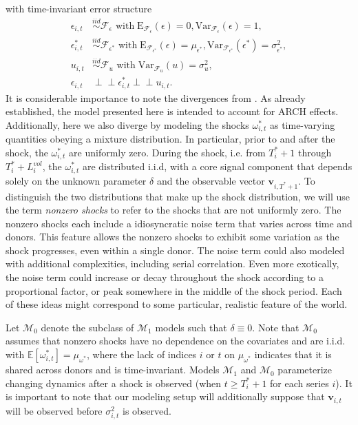 \documentclass[11pt,3p,review,authoryear]{elsarticle}
\newcommand{\x}{\textbf{v}}
\newcommand{\simiid}{\stackrel{iid}{\sim}} %
\newcommand{\indep}{\perp \!\!\! \perp } %
\def\mrm#1{\mathrm{#1}} %
\def\mc#1{\mathcal{#1}} %
\def\E{\mathbb{E}} %
\def\mc#1{\mathcal{#1}}
\theoremstyle{definition}
\begin{document}
with time-invariant error structure
  \begin{align*}
    \epsilon_{i,t} &\simiid \mc{F}_{\epsilon} \text{ with}  \; \mrm{E}_{\mc{F}_{\epsilon}}(\epsilon) = 0, \mrm{Var}_{\mc{F}_{\epsilon}}(\epsilon)  = 1,  \\
    \epsilon^{*}_{i,t} &\simiid \mc{F}_{\epsilon^{*}} \text{ with}  \; \mrm{E}_{\mc{F}_{\epsilon^{*}}}(\epsilon) = \mu_{\epsilon^{*}}, \mrm{Var}_{\mc{F}_{\epsilon^{*}}}(\epsilon^{*})  = \sigma^2_{\epsilon^{*}},  \\
    u_{i,t} & \simiid  \mc{F}_{u} \text{ with}  \; \mrm{Var}_{\mc{F}_{u}}(u) = \sigma^2_{u},\\
    \epsilon_{i,t} & \indep  \epsilon^{*}_{i,t}  \indep u_{i,t}.
    \end{align*}
It is considerable importance to note the divergences from \cite{lin2021minimizing}.  As already established, the model presented here is intended to account for ARCH effects.  Additionally, here we also diverge by modeling the shocks $\omega^{*}_{i,t}$ as time-varying quantities obeying a mixture distribution.  In particular, prior to and after the shock, the  $\omega^{*}_{i,t}$  are uniformly zero.  During the shock, i.e. from $T^{*}_{i}+1$ through $T^{*}_{i}+L^{vol}_{i}$, the $\omega^{*}_{i,t}$ are distributed i.i.d, with a core signal component that depends solely on the unknown parameter $\delta$ and the observable vector $\x_{i,T^{*}+1}$.  To distinguish the two distributions that make up the shock distribution, we will use the term \textit{nonzero shocks} to refer to the shocks that are not uniformly zero.  The nonzero shocks each include a idiosyncratic noise term that varies across time and donors.  This feature allows the nonzero shocks to exhibit some variation as the shock progresses, even within a single donor.  The noise term could also modeled with additional complexities, including serial correlation.  Even more exotically, the noise term could increase or decay throughout the shock according to a proportional factor, or peak somewhere in the middle of the shock period.  Each of these ideas might correspond to some particular, realistic feature of the world.

Let $\mc{M}_{0}$ denote the subclass of $\mc{M}_{1}$ models such that $\delta \equiv 0$.  Note that $\mc{M}_{0}$ assumes that nonzero shocks have no dependence on the covariates and are i.i.d. with $\E[ \omega^{*}_{i,t}]=\mu_{\omega^{*}}$, where the lack of indices $i$ or $t$ on $\mu_{\omega^{*}}$ indicates that it is shared across donors and is time-invariant. Models $\mc{M}_{1}$ and $\mc{M}_{0}$ parameterize changing dynamics after a shock is observed (when $t \geq T_i^*+1$ for each series $i$). It is important to note that our modeling setup will additionally suppose that $\x_{i,t}$ will be observed before $\sigma_{i,t}^2$ is observed. 
\end{document}
